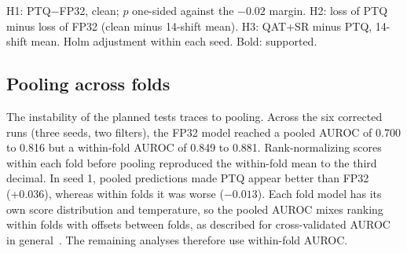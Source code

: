 \documentclass[preprint,12pt]{elsarticle}
\begin{document}
\begin{table}[!t]
\caption{Planned hypotheses (PD versus HC, raw input, zero-phase filter): pooled predictions as planned and after per-fold rank normalization (exploratory).}
\label{tab:hyp}
\centering\small
{}

\vspace{2pt}\parbox{\linewidth}{\footnotesize H1: PTQ$-$FP32, clean; $p$ one-sided against the $-0.02$ margin. H2: loss of PTQ minus loss of FP32 (clean minus 14-shift mean). H3: QAT+SR minus PTQ, 14-shift mean. Holm adjustment within each seed. Bold: supported.}
\end{table}

\subsection{Pooling across folds}
The instability of the planned tests traces to pooling. Across the six corrected runs (three seeds, two filters), the FP32 model reached a pooled AUROC of 0.700 to 0.816 but a within-fold AUROC of 0.849 to 0.881. Rank-normalizing scores within each fold before pooling reproduced the within-fold mean to the third decimal. In seed 1, pooled predictions made PTQ appear better than FP32 (+0.036), whereas within folds it was worse ($-0.013$). Each fold model has its own score distribution and temperature, so the pooled AUROC mixes ranking within folds with offsets between folds, as described for cross-validated AUROC in general~\cite{Forman2010,Airola2011}. The remaining analyses therefore use within-fold AUROC.
\end{document}
